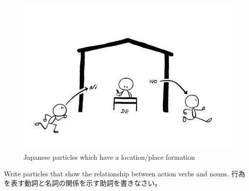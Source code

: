 \documentclass[uplatex,dvipdfmx,b5paper,english,10pt]{jsbook}
\begin{document}
\begin{figure}[htb]\centering\small
\includegraphics[trim=40 70 70 140, clip, width=.45\hsize]{subfiles/toshokan-nidewo.pdf}
\caption{Japanese particles which have a location/place formation}
\label{fig:location-formation}
\end{figure}


\begin{toiquestion}
\ifEnglish
Write particles that show the relationship between action verbs and nouns.
\else
行為を表す動詞と名詞の関係を示す助詞を書きなさい。
\fi
\end{toiquestion}
\end{document}
